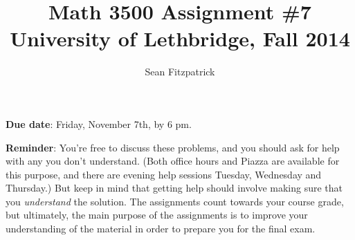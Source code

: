 \documentclass[letterpaper,12pt]{article}
\title{Math 3500 Assignment \#7\\University of Lethbridge, Fall 2014}
\author{Sean Fitzpatrick}
\begin{document}
 \maketitle


{\bf Due date}: Friday, November 7th, by 6 pm.

\bigskip

{\bf Reminder}: You're free to discuss these problems, and you should ask for help with any you don't understand. (Both office hours and Piazza are available for this purpose, and there are evening help sessions Tuesday, Wednesday and Thursday.) But keep in mind that getting help should involve making sure that you {\em understand} the solution. The assignments count towards your course grade, but ultimately, the main purpose of the assignments is to improve your understanding of the material in order to prepare you for the final exam.
\end{document}
